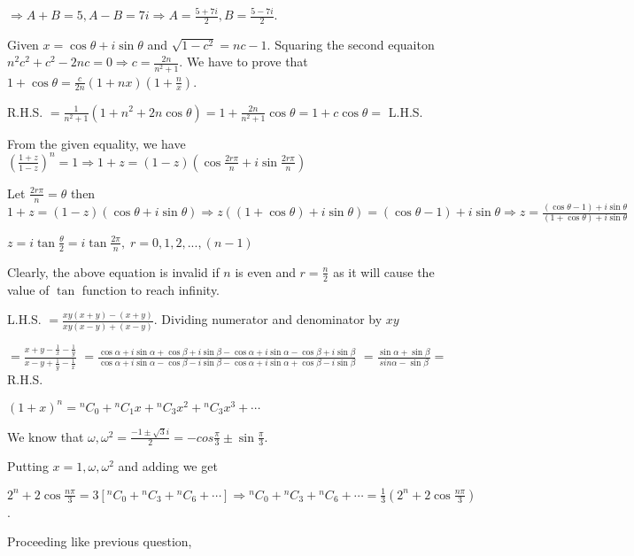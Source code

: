   $\Rightarrow A + B = 5, A - B = 7i \Rightarrow A = \frac{5 + 7i}{2}, B = \frac{5 - 7i}{2}$.
\item Given $x = \cos\theta + i\sin\theta$ and $\sqrt{1 - c^2} = nc - 1$. Squaring the second equaiton
  $n^2c^2 + c^2 - 2nc  = 0 \Rightarrow c = \frac{2n}{n^2 + 1}$. We have to prove that $1 + \cos\theta =
  \frac{c}{2n}(1 + nx)\left(1 + \frac{n}{x}\right)$.

  R.H.S. $= \frac{1}{n^2 + 1}\left(1 + n^2 + 2n\cos\theta\right) = 1 + \frac{2n}{n^2 + 1}\cos\theta = 1 +
  c\cos\theta =$ L.H.S.
\item From the given equality, we have $\left(\frac{1+z}{1-z}\right)^n = 1\Rightarrow 1 + z = (1 -
  z)(\cos\frac{2r\pi}{n} +i \sin\frac{2r\pi}{n})$

  Let $\frac{2r\pi}{n} = \theta$ then $1 + z = (1 - z)(\cos\theta + i \sin\theta) \Rightarrow z((1 +
  \cos\theta) + i \sin\theta) = (\cos\theta - 1) + i \sin\theta
  \Rightarrow z = \frac{(\cos\theta - 1) + i \sin\theta}{(1 + \cos\theta) + i \sin\theta}$

  $z = i \tan\frac{\theta}{2} = i \tan\frac{2\pi}{n}, \; r = 0, 1, 2, ..., (n - 1)$

  Clearly, the above equation is invalid if $n$ is even and $r =
  \frac{n}{2}$ as it will cause the value of $\tan$ function to reach infinity.
\item L.H.S. $= \frac{xy(x + y) - (x + y)}{xy(x - y)+(x - y)}$. Dividing numerator and denominator by $xy$

  $= \frac{x + y - \frac{1}{x} - \frac{1}{y}}{x - y + \frac{1}{y} - \frac{1}{x}}$
  $= \frac{\cos\alpha + i \sin\alpha + \cos\beta + i \sin\beta -
  \cos\alpha + i\sin\alpha - \cos\beta + i \sin\beta}{\cos\alpha + i
  \sin\alpha - \cos\beta - i \sin\beta - \cos\alpha + i\sin\alpha +
  \cos\beta - i \sin\beta}$
  $= \frac{\sin\alpha + \sin\beta}{sin\alpha - \sin\beta} =$ R.H.S.
\item $(1 + x)^n = {^nC_0} + {^nC_1}x + {^nC_3}x^2 + {^nC_3}x^3 + \cdots$

  We know that $\omega, \omega^2 = \frac{-1\pm\sqrt{3}i}{2} = -cos\frac{\pi}{3} \pm \sin\frac{\pi}{3}$.

  Putting $x = 1, \omega, \omega^2$ and adding we get

  $2^n + 2\cos\frac{n\pi}{3} = 3[{}^nC_0 + {}^nC_3 + {}^nC_6 + \cdots] \Rightarrow {}^nC_0 + {}^nC_3 +
  {}^nC_6 + \cdots = \frac{1}{3}\left(2^n + 2\cos\frac{n\pi}{3}\right)$.
\item Proceeding like previous question,

